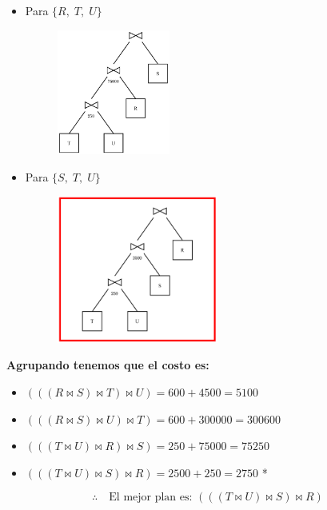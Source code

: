 \documentclass{templateNote}
\newcommand{\newparagraph}{\par\vspace{\baselineskip}\noindent}
\begin{document}
\begin{enumerate}
\begin{enumerate}[label=\arabic*)]
\begin{itemize}
            \item Para $\{R, \; T, \; U\}$
            \begin{figure}[H]
                \centering
                \includegraphics[width=0.35\textwidth]{img/E3-A3.png}
            \end{figure}

            \item Para $\{S, \; T, \; U\}$
            \begin{figure}[H]
                \centering
                \includegraphics[width=0.5\textwidth]{img/E3-A4.png}
            \end{figure}
        \end{itemize}

        \newpage
        \textbf{Agrupando tenemos que el costo es:}
        \begin{itemize}
            \item $(((R \Join S) \Join T) \Join U) = 600 + 4500 = 5100$
            \item $(((R \Join S) \Join U) \Join T) = 600 + 300000 = 300600$
            \item $(((T \Join U) \Join R) \Join S) = 250 + 75000 = 75250$
            \item $(((T \Join U) \Join S) \Join R) = 2500 + 250 = 2750$ *
        \end{itemize}

        \begin{equation*}
            \therefore \quad \text{El mejor plan es: } (((T \Join U) \Join S) \Join R)
        \end{equation*}
        \newparagraph


\end{enumerate}
\end{enumerate}
\end{document}
